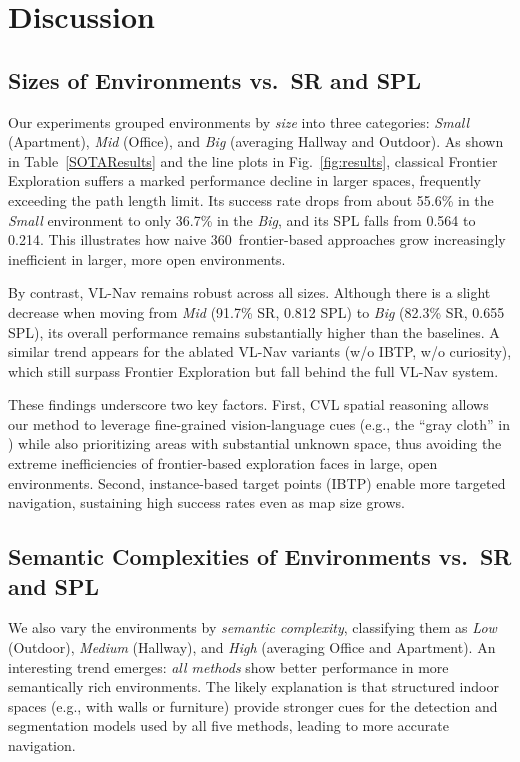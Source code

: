 \section{Discussion}
\label{sec:discussion}

\subsection{Sizes of Environments vs.\ SR and SPL}
Our experiments grouped environments by \emph{size} into three categories: \textit{Small} (Apartment), \textit{Mid} (Office), and \textit{Big} (averaging Hallway and Outdoor). As shown in Table~\ref{SOTAResults} and the line plots in Fig.~\ref{fig:results}, classical Frontier Exploration suffers a marked performance decline in larger spaces, frequently exceeding the path length limit. Its success rate drops from about 55.6\% in the \textit{Small} environment to only 36.7\% in the \textit{Big}, and its SPL falls from 0.564 to 0.214. This illustrates how naive 360\textdegree\ frontier-based approaches grow increasingly inefficient in larger, more open environments.

By contrast, VL-Nav remains robust across all sizes. Although there is a slight decrease when moving from \textit{Mid} (91.7\% SR, 0.812 SPL) to \textit{Big} (82.3\% SR, 0.655 SPL), its overall performance remains substantially higher than the baselines. A similar trend appears for the ablated VL-Nav variants (w/o IBTP, w/o curiosity), which still surpass Frontier Exploration but fall behind the full VL-Nav system.

These findings underscore two key factors. First, CVL spatial reasoning allows our method to leverage fine-grained vision-language cues (e.g., the “gray cloth” in ) while also prioritizing areas with substantial unknown space, thus avoiding the extreme inefficiencies of frontier-based exploration faces in large, open environments. Second, instance-based target points (IBTP) enable more targeted navigation, sustaining high success rates even as map size grows.

\subsection{Semantic Complexities of Environments vs.\ SR and SPL}
We also vary the environments by \emph{semantic complexity}, classifying them as \textit{Low} (Outdoor), \textit{Medium} (Hallway), and \textit{High} (averaging Office and Apartment). An interesting trend emerges: \textit{all methods} show better performance in more semantically rich environments. The likely explanation is that structured indoor spaces (e.g., with walls or furniture) provide stronger cues for the detection and segmentation models used by all five methods, leading to more accurate navigation.

